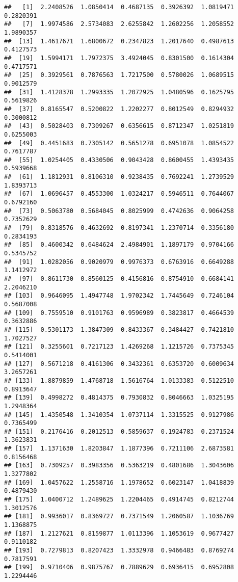 \documentclass[
]{article}
\begin{document}
\begin{verbatim}
##   [1]  2.2408526  1.0850414  0.4687135  0.3926392  1.0819471  0.2820391
##   [7]  1.9974586  2.5734083  2.6255842  1.2602256  1.2058552  1.9890357
##  [13]  1.4617671  1.6800672  0.2347823  1.2017640  0.4987613  0.4127573
##  [19]  1.5994171  1.7972375  3.4924045  0.8301500  0.1614304  0.4717571
##  [25]  0.3929561  0.7876563  1.7217500  0.5780026  1.0689515  0.9012579
##  [31]  1.4128378  1.2993335  1.2072925  1.0480596  0.1625795  0.5619826
##  [37]  0.8165547  0.5200822  1.2202277  0.8012549  0.8294932  0.3000812
##  [43]  0.5028403  0.7309267  0.6356615  0.8712347  1.0251819  0.6255003
##  [49]  0.4451683  0.7305142  0.5651278  0.6951078  1.0854522  0.7617787
##  [55]  1.0254405  0.4330506  0.9043428  0.8600455  1.4393435  0.5939668
##  [61]  1.1812931  0.8106310  0.9238435  0.7692241  1.2739529  1.8393713
##  [67]  1.0696457  0.4553300  1.0324217  0.5946511  0.7644067  0.6792160
##  [73]  0.5063780  0.5684045  0.8025999  0.4742636  0.9064258  0.7352629
##  [79]  0.8318576  0.4632692  0.8197341  1.2370714  0.3356180  0.2834193
##  [85]  0.4600342  0.6484624  2.4984901  1.1897179  0.9704166  0.5345752
##  [91]  1.0282056  0.9020979  0.9976373  0.6763916  0.6649288  1.1412972
##  [97]  0.8611730  0.8560125  0.4156816  0.8754910  0.6684141  2.2046210
## [103]  0.9646095  1.4947748  1.9702342  1.7445649  0.7246104  0.5687008
## [109]  0.7559510  0.9101763  0.9596989  0.3823817  0.4664539  0.3632886
## [115]  0.5301173  1.3847309  0.8433367  0.3484427  0.7421810  1.7027527
## [121]  0.3255601  0.7217123  1.4269268  1.1215726  0.7375345  0.5414001
## [127]  0.5671218  0.4161306  0.3432361  0.6353720  0.6009634  3.2657261
## [133]  1.8879859  1.4768718  1.5616764  1.0133383  0.5122510  0.8913647
## [139]  0.4998272  0.4814375  0.7930832  0.8046663  1.0325195  1.2948364
## [145]  1.4350548  1.3410354  1.0737114  1.3315525  0.9127986  0.7365499
## [151]  0.2176416  0.2012513  0.5859637  0.1924783  0.2371524  1.3623831
## [157]  1.1371630  1.8203847  1.1877396  0.7211106  2.6873581  0.8156468
## [163]  0.7309257  0.3983356  0.5363219  0.4801686  1.3043606  1.3277802
## [169]  1.0457622  1.2558716  1.1978652  0.6023147  1.0418839  0.4879430
## [175]  1.0400712  1.2489625  1.2204465  0.4914745  0.8212744  1.3012576
## [181]  0.9936017  0.8369727  0.7371549  1.2060587  1.1036769  1.1368875
## [187]  1.2127621  0.8159877  1.0113396  1.1053619  0.9677427  0.9110182
## [193]  0.7279813  0.8207423  1.3332978  0.9466483  0.8769274  0.7817591
## [199]  0.9710406  0.9875767  0.7889629  0.6936415  0.6952808  1.2294446

\end{verbatim}
\end{document}
